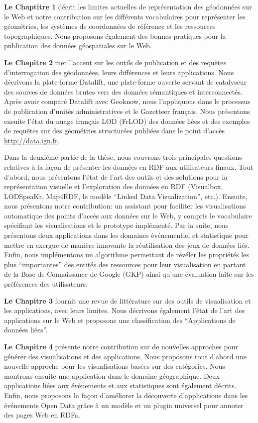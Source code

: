 \documentclass[a4paper,11pt,twoside]{report}
\begin{document}
\textbf{Le Chaptitre 1} décrit les limites actuelles de représentation des géodonnées sur le Web et notre contribution sur les différents vocabulaires pour représenter les géométries, les systèmes de coordonnées de référence et les ressources topographiques. Nous proposons également des bonnes pratiques pour la publication des données géospatiales sur le Web.

\textbf{Le Chapitre 2} met l'accent sur les outils de publication et des requêtes d'interrogation des géodonnées, leurs différences et leurs applications. Nous décrivons la plate-forme Datalift, une plate-forme ouverte servant de catalyseur des sources de données brutes vers des données sémantiques et interconnectés. Après avoir comparé Datalift avec Geoknow, nous l'appliquons dans le processus de publication d'unités administratives et le Gazetteer français. Nous présentons ensuite l'état du nuage français LOD (FrLOD) des données liées et des exemples de requêtes sur des géométries structurées publiées dans le point d'accès \url{http://data.ign.fr}.

Dans la deuxième partie de la thèse, nous couvrons trois principales questions relatives à la façon de présenter les données en RDF aux utilisateurs finaux. Tout d'abord, nous présentons l'état de l'art des outils et des solutions pour la représentation visuelle et l'exploration des données en RDF (Visualbox, LODSpeaKr, Map4RDF, le modèle ``Linked Data Visualization'', etc.). Ensuite, nous présentons notre contribution: un assistant pour faciliter les visualisations automatique des points d'accès aux données sur le Web, y compris le vocabulaire spécifiant les visualisations et le prototype implémenté. Par la suite, nous présentons deux applications dans les domaines événementiel et statistique pour mettre en exergue de manière innovante la réutilisation des jeux de données liés. Enfin, nous implémentons un algorithme permettant de révéler les propriétés les plus ``importantes'' des entités des ressources pour leur visualisation en partant de la Base de Connaissance de Google (GKP) ainsi qu'une évaluation faite sur les préférences des utilisateurs.

\textbf{Le Chapitre 3} fournit une revue de littérature sur des outils de visualisation et les applications, avec leurs limites. Nous décrivons également l'état de l'art des applications sur le Web et proposons une classification des ``Applications de données liées''.

\textbf{Le Chapitre 4} présente notre contribution sur de nouvelles approches pour générer des visualisations et des applications. Nous proposons tout d'abord une nouvelle approche pour les visualisations basées sur des catégories. Nous montrons ensuite une application dans le domaine géographique. Deux applications liées aux événements et aux statistiques sont également décrits. Enfin, nous proposons la façon d'améliorer la découverte d'applications dans les événements Open Data grâce à un modèle et un plugin universel pour annoter des pages Web en RDFa.
\end{document}
